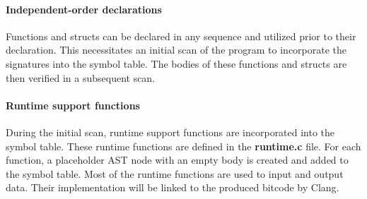 \documentclass{article}
\begin{document}
\paragraph*{Independent-order declarations}
Functions and structs can be declared in any sequence and utilized prior to their declaration.
This necessitates an initial scan of the program to incorporate the signatures into the symbol table.
The bodies of these functions and structs are then verified in a subsequent scan.

\paragraph*{Runtime support functions}
During the initial scan, runtime support functions are incorporated into the symbol table.
These runtime functions are defined in the \textbf{runtime.c} file.
For each function, a placeholder AST node with an empty body is created
and added to the symbol table.
Most of the runtime functions are used to input and output data.
Their implementation will be linked to the produced bitcode by Clang.
\end{document}
